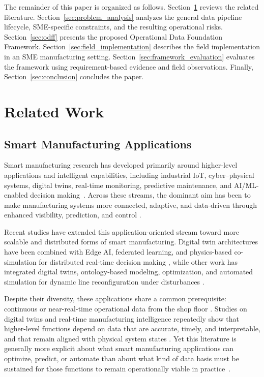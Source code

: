 \documentclass[systems,article,accept,pdftex,moreauthors]{Definitions/mdpi}
\begin{document}
The remainder of this paper is organized as follows. Section~\ref{sec:related_work} reviews the related literature. Section~\ref{sec:problem_analysis} analyzes the general data pipeline lifecycle, SME-specific constraints, and the resulting operational risks. Section~\ref{sec:odff} presents the proposed Operational Data Foundation Framework. Section~\ref{sec:field_implementation} describes the field implementation in an SME manufacturing setting. Section~\ref{sec:framework_evaluation} evaluates the framework using requirement-based evidence and field observations. Finally, Section~\ref{sec:conclusion} concludes the paper.


\section{Related Work}
\label{sec:related_work}

\subsection{Smart Manufacturing Applications}
\label{sec:smart_manufacturing_applications}

Smart manufacturing research has developed primarily around higher-level applications and intelligent capabilities, including industrial IoT, cyber--physical systems, digital twins, real-time monitoring, predictive maintenance, and AI/ML-enabled decision \mbox{making \cite{rozhok2026advanced, bueno2020smart, cinar2020digital, atalay2022digital}}. Across these streams, the dominant aim has been to make manufacturing systems more connected, adaptive, and data-driven through enhanced visibility, prediction, and control \cite{rozhok2026advanced, bueno2020smart, song2025smart}.

Recent studies have extended this application-oriented stream toward more scalable and distributed forms of smart manufacturing. Digital twin architectures have been combined with Edge AI, federated learning, and physics-based co-simulation for distributed real-time decision making \cite{padmavathi2025digital}, while other work has integrated digital twins, ontology-based modeling, optimization, and automated simulation for dynamic line reconfiguration under disturbances \cite{fu2025digital}.

Despite their diversity, these applications share a common prerequisite: continuous or near-real-time operational data from the shop floor \cite{nguyen2025aidriven, tao2017digital, ding2019digital}. Studies on digital twins and real-time manufacturing intelligence repeatedly show that higher-level functions depend on data that are accurate, timely, and interpretable, and that remain aligned with physical system states \cite{nguyen2025aidriven, ojstersek2023optimizing, qamsane2019digital}. Yet this literature is generally more explicit about what smart manufacturing applications can optimize, predict, or automate than about what kind of data basis must be sustained for those functions to remain operationally viable in \mbox{practice \cite{rozhok2026advanced, ciano2021digital, nguyen2025aidriven}}.
\end{document}
